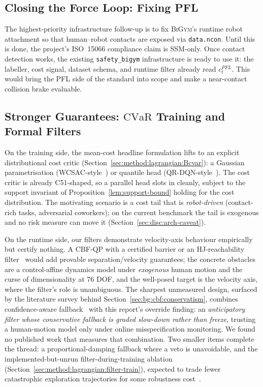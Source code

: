 \documentclass[11pt,a4paper]{report}
\newcommand{\ssm}{SSM}
\newcommand{\pfl}{PFL}
\newcommand{\iso}{ISO~15066}
\newcommand{\cvar}{\ensuremath{\mathrm{CVaR}}}
\newcommand{\bigym}{\textsc{BiGym}}
\newcommand{\sbigym}{\texttt{safety\_bigym}}
\begin{document}
\subsection{Closing the Force Loop: Fixing \pfl{}}
\label{sec:fw:pfl}

The highest-priority infrastructure follow-up is to fix \bigym{}'s
runtime robot attachment so that human--robot contacts are exposed via
\texttt{data.ncon}. Until this is done, the project's \iso{}
compliance claim is \ssm{}-only. Once contact detection works, the
existing \sbigym{} infrastructure is ready to use it: the labeller,
cost signal, dataset schema, and runtime filter already read
$c^{\pfl}_t$. This would bring the \pfl{} side of the standard into
scope and make a near-contact collision brake evaluable.

\subsection{Stronger Guarantees: \cvar{} Training and Formal Filters}
\label{sec:fw:cvar}
\label{sec:fw:formal}
\label{sec:fw:fallback}
\label{sec:fw:filter-during-training}

On the training side, the mean-cost headline formulation lifts to an
explicit distributional cost critic
(Section~\ref{sec:method:lagrangian:Bcvar}): a Gaussian
parametrisation (WCSAC-style~\cite{yang2021wcsac}) or quantile head
(QR-DQN-style~\cite{dabney2018qrdqn}). The cost
critic is already C51-shaped, so a parallel head slots in cleanly,
subject to the support invariant of
Proposition~\ref{lem:support-bound} holding for the cost
distribution. The motivating scenario is a cost tail that is
\emph{robot-driven} (contact-rich tasks, adversarial coworkers); on
the current benchmark the tail is exogenous and no risk measure can
move it (Section~\ref{sec:disc:arch-caveat}).

On the runtime side, our filters demonstrate velocity-axis behaviour
empirically but certify nothing. A CBF-QP with a certified barrier
or an HJ-reachability
filter~\cite{bansal2017hamilton,hsu2024safetyfilter} would add
provable separation/velocity guarantees; the concrete obstacles are
a control-affine dynamics model under \emph{exogenous} human motion
and the curse of dimensionality at 76 DOF, and the well-posed target
is the velocity axis, where the filter's role is unambiguous. The
sharpest unmeasured design, surfaced by the literature survey behind
Section~\ref{sec:bg:cbf:conservatism}, combines confidence-aware
fallback~\cite{tian2022confidence} with this report's override
finding: an \emph{anticipatory filter whose conservative fallback is
graded slow-down rather than freeze}, trusting a human-motion model
only under online misspecification monitoring. We found no published
work that measures that combination. Two smaller items complete the
thread: a proportional-damping fallback where a veto is unavoidable,
and the implemented-but-unrun filter-during-training ablation
(Section~\ref{sec:method:lagrangian:filter-train}), expected to
trade fewer catastrophic exploration trajectories for some
robustness cost~\cite{cbfrl2024,shield2025}.
\end{document}
